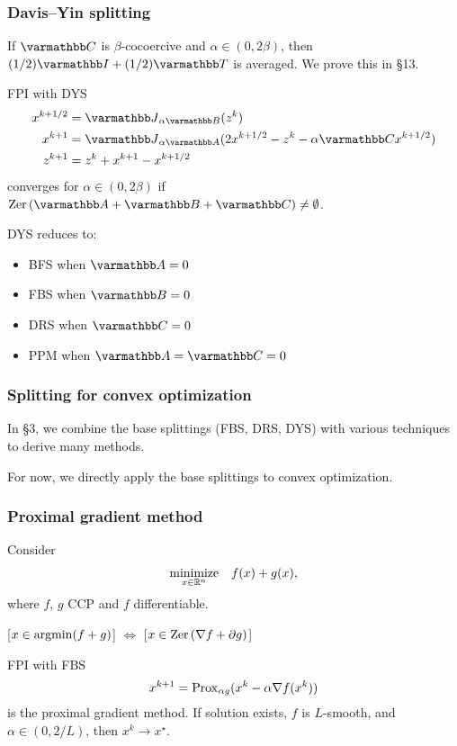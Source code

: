 \documentclass[10pt,mathserif]{beamer}
\begin{document}
\begin{frame}[plain]
\frametitle{Davis--Yin splitting}

If $\opC $ is $\beta$-cocoercive and $\alpha\in (0,2\beta)$,
then
$(1/2)\opI+(1/2)\opT$ is averaged. We prove this in \S13.

\vspace{0.2in}
FPI with DYS
\begin{align*}
x^{k+1/2}&=\opJ_{\alpha \opB}(z^k)\\
x^{k+1}&=\opJ_{\alpha \opA}(2x^{k+1/2}-z^k-\alpha \opC x^{k+1/2})\\
z^{k+1}&=z^k+x^{k+1}-x^{k+1/2}
\end{align*}
converges for $\alpha\in (0,2\beta)$ if $\zer(\opA+\opB+\opC )\ne\emptyset$.

\vspace{0.2in}

DYS reduces to:
\begin{itemize}
\item BFS when $\opA=0$
\item
FBS when $\opB=0$
\item
DRS when $\opC =0$
\item
PPM when $\opA=\opC =0$
\end{itemize}
\end{frame}



\begin{frame}
\frametitle{Splitting for convex optimization}
In \S3, we combine the base splittings (FBS, DRS, DYS) with various techniques to derive many methods.

\vspace{0.2in}
For now, we directly apply the base splittings to convex optimization.
\end{frame}


\begin{frame}
\frametitle{Proximal gradient method}
Consider
\[
\begin{array}{ll}
\underset{x\in \mathbb{R}^n}{\mbox{minimize}}
&f(x)+g(x),
\end{array}
\]
where $f$, $g$ CCP and $f$ differentiable.

[$x\in \operatorname*{argmin}(f+g)$] $\Leftrightarrow$ [$x\in \mathrm{Zer}\, (\nabla f+\partial g)$]

\vspace{0.2in}


FPI with FBS
\[
x^{k+1}=\mathrm{Prox}_{\alpha g}(x^k-\alpha \nabla f(x^k))
\]
is the proximal gradient method.
If solution exists, $f$ is $L$-smooth, and $\alpha\in (0,2/L)$, then $x^k\rightarrow x^\star$.
\end{frame}
\end{document}
